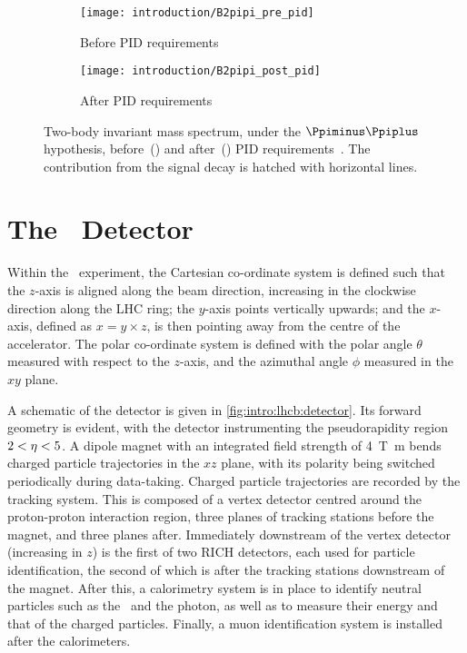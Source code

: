 \begin{figure}
  \begin{subfigure}[b]{0.5\textwidth}
    \centering
    \texttt{[image: introduction/B2pipi\_pre\_pid]}
    \caption{Before \ac{PID} requirements}
    \label{fig:intro:lhcb:pid_power:pre}
  \end{subfigure}
  \begin{subfigure}[b]{0.5\textwidth}
    \centering
    \texttt{[image: introduction/B2pipi\_post\_pid]}
    \caption{After \ac{PID} requirements}
    \label{fig:intro:lhcb:pid_power:post}
  \end{subfigure}
  \caption{%
    Two-body invariant mass spectrum, under the $\pimpip$ hypothesis, 
    before~() and 
    after~() \ac{PID} 
    requirements~\cite{Aaij:2012as}.
    The contribution from the signal decay is hatched with horizontal lines.
  }
  \label{fig:intro:lhcb:pid_power}
\end{figure}

\section{The \lhcb\ Detector}
\label{chap:intro:lhcb:detector}

Within the \lhcb\ experiment, the Cartesian co-ordinate system is defined such 
that the $z$-axis is aligned along the beam direction, increasing in the 
clockwise direction along the \ac{LHC} ring; the $y$-axis points vertically 
upwards; and the $x$-axis, defined as $x = y \times z$, is then pointing away 
from the centre of the accelerator.
The polar co-ordinate system is defined with the polar angle $\theta$ measured 
with respect to the $z$-axis, and the azimuthal angle $\phi$ measured in the 
$xy$ plane.

A schematic of the detector is given in \cref{fig:intro:lhcb:detector}.
Its forward geometry is evident, with the detector instrumenting the 
pseudorapidity region $2 < \eta < 5$.
A dipole magnet with an integrated field strength of \SI{4}{\tesla\metre} bends 
charged particle trajectories in the $xz$ plane, with its polarity being 
switched periodically during data-taking.
Charged particle trajectories are recorded by the tracking system.
This is composed of a vertex detector centred around the proton-proton 
interaction region, three planes of tracking stations before the magnet, and 
three planes after.
Immediately downstream of the vertex detector (increasing in $z$) is the first 
of two \ac{RICH} detectors, each used for particle identification, the second 
of which is after the tracking stations downstream of the magnet.
After this, a calorimetry system is in place to identify neutral particles such 
as the \Ppizero\ and the photon, as well as to measure their energy and that of 
the charged particles.
Finally, a muon identification system is installed after the calorimeters.

